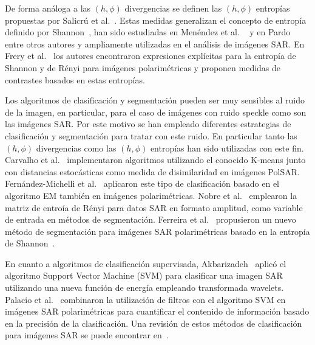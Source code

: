 \documentclass[11pt]{article}
\begin{document}
De forma análoga a las $(h,\phi)$ divergencias se definen las $(h,\phi)$ entropías propuestas por Salicrú et al.~\cite{salicruetal1993}. Estas medidas generalizan el concepto de entropía definido por Shannon~\cite{Shannon1948}, han sido estudiadas en Menéndez et al. ~\cite{Menendez1997} y en Pardo~\cite{pardo2005statistical} entre otros autores y  ampliamente utilizadas en el análisis de imágenes SAR. En Frery et al.~\cite{Frery2012} los autores encontraron expresiones explícitas para la entropía de Shannon y de Rényi para imágenes polarimétricas y proponen medidas de contrastes basados en estas entropías. 

Los algoritmos de clasificación y segmentación pueden ser muy sensibles al ruido de la imagen, en particular, para el caso de imágenes con ruido speckle como son las imágenes SAR. Por este motivo se han empleado diferentes estrategias de clasificación y segmentación para tratar con este ruido. En particular tanto las $(h,\phi)$ divergencias como las $(h,\phi)$ entropías han sido utilizadas con este fin. Carvalho et al.~\cite{Carvalho2019} implementaron algoritmos utilizando el conocido K-means junto con distancias estocásticas como medida de disimilaridad en imágenes PolSAR. 
Fernández-Michelli et al.~\cite{Fernandez2017} aplicaron este tipo de clasificación basado en el algoritmo EM también en imágenes polarimétricas. 
Nobre et al.~\cite{Nobre2016} emplearon la matriz de entroía de Rényi para datos SAR en formato amplitud, como variable de entrada en métodos de segmentación. 
Ferreira et al.~\cite{Ferreira2020} propusieron un nuevo método de segmentación para imágenes SAR polarimétricas basado en la entropía de Shannon~\cite{Shannon1948}.   


En cuanto a algoritmos de clasificación supervisada, Akbarizadeh~\cite{Akbarizadeh2012} aplicó el algoritmo Support Vector Machine (SVM) para clasificar una imagen SAR utilizando una nueva función de energía empleando transformada wavelets. 
Palacio et al.~\cite{Palacio2019} combinaron la utilización de filtros con el algoritmo SVM en imágenes SAR polarimétricas para cuantificar el contenido de información basado en la precisión de la clasificación.  
Una revisión de estos métodos de clasificación para imágenes SAR se puede encontrar en~\cite{Parikh2020}. 
\end{document}
